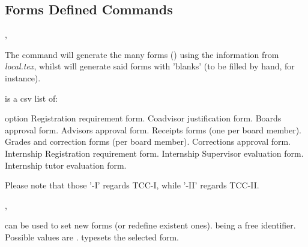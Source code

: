 \documentclass[article,nogeometry,english,tocdepth=3,secdepth=3]{ufrgscca} %
\begin{document}
\subsection{Forms Defined Commands}\label{forms.commands}
\begin{codedescribe}[code,update=2023/05/29]{\tcforms,\tcemptyforms}
	\begin{codesyntax}%
\end{codesyntax}
The command \tsmacro{\tcforms}{} will generate the many forms () using the information from \emph{local.tex}, whilst \tsmacro{\tcemptyforms}{} will generate said forms with 'blanks' (to be filled by hand, for instance).

\end{codedescribe}

 is a csv list of:
\begin{describelist*}{option}
     {}
     { Registration requirement form.}
     {}
     { Coadvisor justification form.}
     {}
     { Boards approval form.}
     {}
     { Advisors approval form.}
     { Receipts forms (one per board member).}
     {}
     { Grades and correction forms (per board member).}
     {}
     { Corrections approval  form.}
     { Internship Registration requirement form.}
     { Internship Supervisor evaluation form.}
     { Internship tutor evaluation form.}
\end{describelist*}
Please note that those '-I' regards TCC-I, while '-II' regards TCC-II.

\begin{codedescribe}[code,new=2023/11/18]{\SetForm,\MakeForm}
	\begin{codesyntax}%
\end{codesyntax}
\tsobj{\SetForm} can be used to set new forms (or redefine existent ones).  being a free identifier. Possible  values are . \tsobj{\MakeForm} typesets the selected form.
\end{codedescribe}
\end{document}
